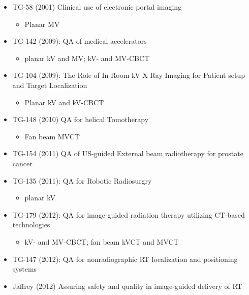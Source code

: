 \documentclass[]{book}
\providecommand{\tightlist}{%
  \setlength{\itemsep}{0pt}\setlength{\parskip}{0pt}}
\theoremstyle{definition}
\theoremstyle{definition}
\theoremstyle{definition}
\theoremstyle{remark}
\begin{document}
\begin{itemize}
\tightlist
\item
  TG-58 (2001) Clinical use of electronic portal imaging

  \begin{itemize}
  \tightlist
  \item
    Planar MV
  \end{itemize}
\item
  TG-142 (2009): QA of medical accelerators

  \begin{itemize}
  \tightlist
  \item
    planar kV and MV; kV- and MV-CBCT
  \end{itemize}
\item
  TG-104 (2009): The Role of In-Room kV X-Ray Imaging for Patient setup
  and Target Localization

  \begin{itemize}
  \tightlist
  \item
    Planar kV and kV-CBCT
  \end{itemize}
\item
  TG-148 (2010) QA for helical Tomotherapy

  \begin{itemize}
  \tightlist
  \item
    Fan beam MVCT
  \end{itemize}
\item
  TG-154 (2011) QA of US-guided External beam radiotherapy for prostate
  cancer
\item
  TG-135 (2011): QA for Robotic Radiosurgry

  \begin{itemize}
  \tightlist
  \item
    planar kV
  \end{itemize}
\item
  TG-179 (2012): QA for image-guided radiation therapy utilizing
  CT-based technologies

  \begin{itemize}
  \tightlist
  \item
    kV- and MV-CBCT; fan beam kVCT and MVCT 
  \end{itemize}
\item
  TG-147 (2012): QA for nonradiographic RT localization and positioning
  systems
\item
  Jaffrey (2012) Assuring safety and quality in image-guided delivery of
  RT
\end{itemize}
\end{document}
